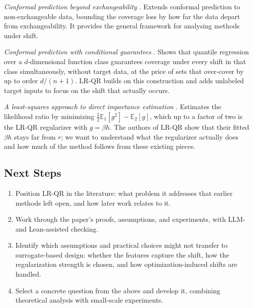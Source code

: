 \documentclass[10pt]{article}
\begin{document}
\vspace{-0.25em}

\textit{Conformal prediction beyond exchangeability} \cite{barber2023conformal}. Extends
conformal prediction to non-exchangeable data, bounding the coverage loss by how far the
data depart from exchangeability. It provides the general framework for analysing methods
under shift.

\vspace{-0.25em}

\textit{Conformal prediction with conditional guarantees} \cite{gibbs2025conformal}.
Shows that quantile regression over a $d$-dimensional function class guarantees coverage
under every shift in that class simultaneously, without target data, at the price of sets
that over-cover by up to order $d/(n+1)$. LR-QR builds on this construction and adds
unlabeled target inputs to focus on the shift that actually occurs.

\vspace{-0.25em}

\textit{A least-squares approach to direct importance estimation} \cite{kanamori2009least}.
Estimates the likelihood ratio by minimizing $\tfrac12\mathbb E_1[g^2]-\mathbb E_2[g]$,
which up to a factor of two is the LR-QR regularizer with $g=\beta h$. The authors of
LR-QR show that their fitted $\beta h$ stays far from $r$; we want to understand what the
regularizer actually does and how much of the method follows from these existing pieces.

\subsection*{Next Steps}

\vspace{-0.25em}

\begin{enumerate}
    \item Position LR-QR in the literature: what problem it addresses that earlier methods
          left open, and how later work relates to it.
    \item Work through the paper's proofs, assumptions, and experiments, with LLM- and
          Lean-assisted checking.
    \item Identify which assumptions and practical choices might not transfer to
          surrogate-based design: whether the features capture the shift, how the
          regularization strength is chosen, and how optimization-induced shifts are
          handled.
    \item Select a concrete question from the above and develop it, combining theoretical
          analysis with small-scale experiments.
\end{enumerate}

\vspace{-5ex}




\end{document}
